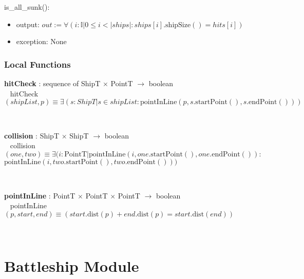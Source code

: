 \documentclass[12pt]{article}
\newcommand\tab[1][0.5in]{\hspace*{#1}}
\begin{document}
\noindent is\_all\_sunk():
\begin{itemize}
\item output: $out := \forall( i : \mathbb{I} | 0 \leq i < |ships| : ships[i].\mbox{shipSize}() = hits[i])$
\item exception: None
\end{itemize}
%
%

\subsubsection* {Local Functions}

\noindent \textbf{hitCheck} : sequence of ShipT $\times$ PointT $\rightarrow$ boolean\\
~\newline
hitCheck$(shipList, p) \equiv \exists( s : ShipT | s \in shipList : \mbox{pointInLine}(p, s.\mbox{startPoint}(), s.\mbox{endPoint}()))$

~\newline

\noindent \textbf{collision} : ShipT $\times$ ShipT $\rightarrow$ boolean\\
~\newline
collision$(one, two) \equiv \exists( i : \mbox{PointT} | \mbox{pointInLine}(i, one.\mbox{startPoint}(), one.\mbox{endPoint}()) :$\\\tab\tab\tab\tab\tab$ \mbox{pointInLine}(i, two.\mbox{startPoint}(), two.\mbox{endPoint}()))$

~\newline

\noindent \textbf{pointInLine} : PointT $\times$ PointT $\times$ PointT $\rightarrow$ boolean\\
~\newline
pointInLine$(p, start, end) \equiv (start.\mbox{dist}(p) + end.\mbox{dist}(p) = start.\mbox{dist}(end))$

~\newline

\newpage

\section* {Battleship Module}
\end{document}
